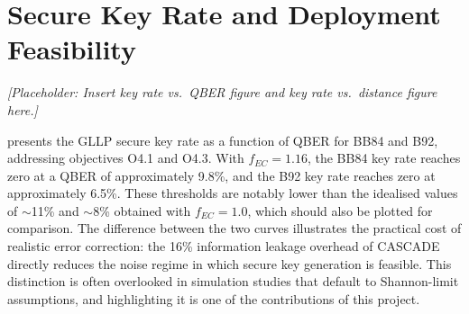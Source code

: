 \documentclass[10pt, a4paper]{report}
\begin{document}



\section{Secure Key Rate and Deployment Feasibility}



\textit{[Placeholder: Insert key rate vs.\ QBER figure and key rate vs.\ distance figure here.]}

 presents the GLLP secure key rate as a function of QBER for BB84 and B92, addressing objectives O4.1 and O4.3. With $f_{EC} = 1.16$, the BB84 key rate reaches zero at a QBER of approximately 9.8\%, and the B92 key rate reaches zero at approximately 6.5\%. These thresholds are notably lower than the idealised values of $\sim$11\% and $\sim$8\% obtained with $f_{EC} = 1.0$, which should also be plotted for comparison. The difference between the two curves illustrates the practical cost of realistic error correction: the 16\% information leakage overhead of CASCADE directly reduces the noise regime in which secure key generation is feasible. This distinction is often overlooked in simulation studies that default to Shannon-limit assumptions, and highlighting it is one of the contributions of this project.
\end{document}
